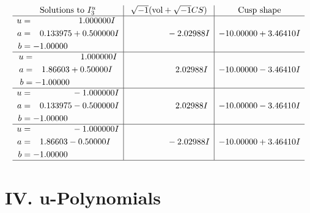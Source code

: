 \documentclass[1p]{elsarticle_modified}
\theoremstyle{definition}
\newcommand{\I}{\sqrt{-1}}
\begin{document}
$$\begin{array}{c|c|c}  
\text{Solutions to }I^u_{3}& \I (\text{vol} + \sqrt{-1}CS) & \text{Cusp shape}\\
 \hline 
\begin{aligned}
u &= \phantom{-0.000000 -}1.000000 I \\
a &= \phantom{-}0.133975 + 0.500000 I \\
b &= -1.00000\phantom{ +0.000000I}\end{aligned}
 & \phantom{-0.000000 } -2.02988 I & -10.00000 + 3.46410 I \\ \hline\begin{aligned}
u &= \phantom{-0.000000 -}1.000000 I \\
a &= \phantom{-}1.86603 + 0.50000 I \\
b &= -1.00000\phantom{ +0.000000I}\end{aligned}
 & \phantom{-0.000000 -}2.02988 I & -10.00000 - 3.46410 I \\ \hline\begin{aligned}
u &= \phantom{-0.000000 } -1.000000 I \\
a &= \phantom{-}0.133975 - 0.500000 I \\
b &= -1.00000\phantom{ +0.000000I}\end{aligned}
 & \phantom{-0.000000 -}2.02988 I & -10.00000 - 3.46410 I \\ \hline\begin{aligned}
u &= \phantom{-0.000000 } -1.000000 I \\
a &= \phantom{-}1.86603 - 0.50000 I \\
b &= -1.00000\phantom{ +0.000000I}\end{aligned}
 & \phantom{-0.000000 } -2.02988 I & -10.00000 + 3.46410 I\\
 \hline 
 \end{array}$$\newpage
\newpage\renewcommand{\arraystretch}{1}
\centering \section*{ IV. u-Polynomials}
\end{document}
